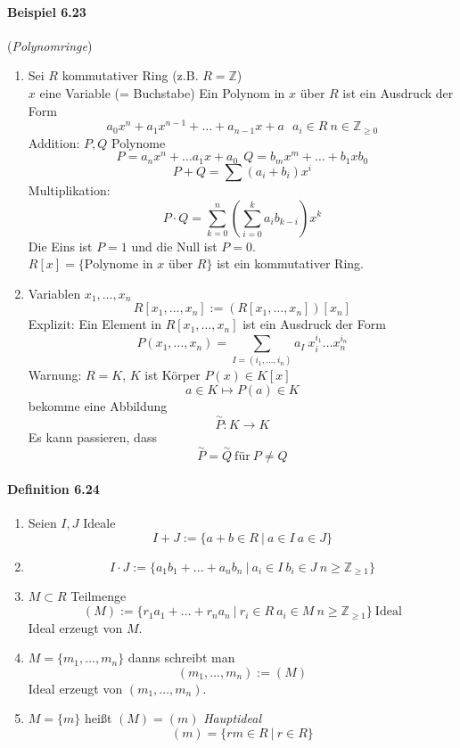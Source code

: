 \documentclass{scrartcl}
\begin{document}
\paragraph{Beispiel 6.23} (\textit{Polynomringe})
\begin{enumerate}
\item Sei $R$ kommutativer Ring (z.B. $R = \mathbb{Z}$) \\
  $x$ eine Variable (= Buchstabe)
  Ein Polynom in $x$ über $R$ ist ein Ausdruck der Form
  \[
    a_0x^n + a_1x^{n-1} + \dots + a_{n-1}x + a~~~a_i \in R~n \in
    \mathbb{Z}_{\geq 0}
  \]
  Addition: $P, Q$ Polynome
  \[
    P = a_nx^n + \dots a_{1}x+a_0 ~~
    Q = b_mx^m + \dots + b_{1}xb_0
  \]
  \[
     P + Q = \sum (a_i + b_i)x^i
   \]
   Multiplikation:
   \[
     P \cdot Q = \sum_{k = 0}^n \left( \sum_{i = 0}^k a_ib_{k - i} \right)x^k
   \]
   Die Eins ist $P = 1$ und die Null ist $P = 0$. \\
   $R[x] = \{\text{Polynome in $x$ über $R$}\}$ ist ein kommutativer Ring.

 \item Variablen $x_1, \dots, x_n$
   \[
     R[x_1, \dots, x_n] := \left(R[x_1, \dots, x_n]\right)[x_n]
   \]
   Explizit: Ein Element in $R[x_1, \dots, x_n]$ ist ein Ausdruck der Form
   \[
     P(x_1, \dots , x_n) = \sum_{I = (i_1, \dots, i_n)} a_I~x_i^{i_1} \dots x_n^{i_n}
   \]
   Warnung: $R = K$, $K$ ist Körper $P(x) \in K[x]$
   \[
     a \in K \mapsto P(a) \in K
   \]
   bekomme eine Abbildung
   \[
     \overset{\sim}{P}: K \to K
   \]
   Es kann passieren, dass
   \[
     \overset{\sim}{P} = \overset{\sim}{Q} ~\text{für} ~ P \neq Q
   \]
\end{enumerate}

\paragraph{Definition 6.24}
\begin{enumerate}
\item Seien $I,J$ Ideale
  \[
    I + J := \{a + b \in R ~|~ a \in I~a \in J\}
  \]
\item
  \[
    I \cdot J := \{a_1b_1 + \dots + a_nb_n ~|~ a_i \in I~ b_i \in J~n \geq
    \mathbb{Z}_{\geq 1}\}
  \]
\item $M \subset R$ Teilmenge
  \[
    (M) := \{r_1a_1 + \dots + r_na_n ~|~ r_i \in R~ a_i \in M ~ n \geq
    \mathbb{Z}_{\geq 1}\} ~\text{Ideal}
  \]
  Ideal erzeugt von $M$.
\item $M = \{m_1, \dots, m_n\}$ danns schreibt man
  \[
    (m_1, \dots, m_n) := (M)
  \]
  Ideal erzeugt von $(m_1, \dots, m_n)$.
\item $M = \{m\}$ heißt $(M) = (m)$ \textit{Hauptideal}
  \[
    (m) = \{rm \in R ~|~ r \in R\}
  \]
\end{enumerate}
\end{document}
